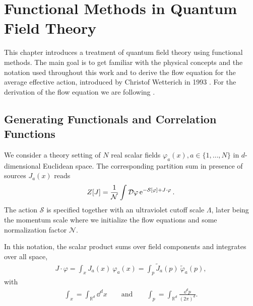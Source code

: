 \chapter{Functional Methods in Quantum Field Theory}\label{chap:FuncMethods}
This chapter introduces a treatment of quantum field theory using functional methods. The main goal is to get familiar with the physical concepts and the notation used throughout this work and to derive the flow equation for the average effective action, introduced by Christof Wetterich in 1993 \cite{Wetterich1992}. 
For the derivation of the flow equation we are following \cite{FloerchingerWetterichQFT, PawlowskiNPgaugeLecture}.

\section{Generating Functionals and Correlation Functions}
We consider a theory setting of $N$ real scalar fields $\varphi_a(x), a \in \{1,\dots,N\}$ in $d$-dimensional Euclidean space. The corresponding partition sum in presence of sources $J_a(x)$ reads
\begin{align}
	Z[J] = \frac{1}{\mathcal{N}} \int \mathcal{D}\varphi \operatorname{e}^{-\mathcal{S}[\varphi] + J\cdot\varphi}.
	\label{eqn:partition}
\end{align}
The action $\mathcal{S}$ is specified together with an ultraviolet cutoff scale $\Lambda$, later being the momentum scale where we initialize the flow equations and some normalization factor $\mathcal{N}$.

In this notation, the scalar product sums over field components and integrates over all space,
\begin{align}
	J\cdot\varphi = \int_x J_a(x) \ \varphi_a(x) = \int_p \tilde{J}_a(p) \ \tilde{\varphi}_a(p),
\end{align}
with
\begin{align}
\int_x = \int_{\mathbb{R}^d} \dd^d x \qquad \text{and} \qquad \int_p = \int_{\mathbb{R}^d} \frac{\dd^d p}{(2\pi)^d}.	
\end{align}

